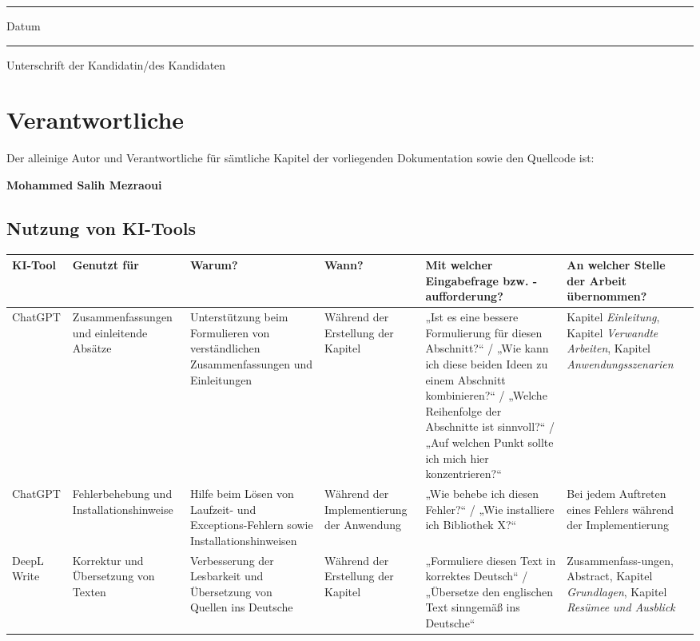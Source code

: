 \begin{small}
\vspace{4cm}
\begin{minipage}[t]{3cm}
	\rule{3cm}{0.5pt}
	Datum
\end{minipage}
\hfill
\begin{minipage}[t]{9cm}
	\rule{9cm}{0.5pt}
	Unterschrift der Kandidatin/des Kandidaten
\end{minipage}

\end{small}

\newpage

\section*{Verantwortliche}

Der alleinige Autor und Verantwortliche für sämtliche Kapitel der vorliegenden Dokumentation sowie den Quellcode ist:

\noindent \textbf{Mohammed Salih Mezraoui}


\newpage

\subsection*{Nutzung von KI-Tools}

\begin{table}
	\begin{small}	
		\begin{tabularx}{\textwidth}{|p{2.5cm}|p{3cm}|X|X|X|X|}
			\hline		
			\textbf{KI-Tool} & \textbf{Genutzt für} & \textbf{Warum?} & \textbf{Wann?} & \textbf{Mit welcher Eingabefrage bzw. -aufforderung?} & \textbf{An welcher Stelle der Arbeit übernommen?}\\
			\hline
			ChatGPT & Zusammenfassungen und einleitende Absätze & Unterstützung beim Formulieren von verständlichen Zusammenfassungen und Einleitungen & Während der Erstellung der Kapitel & „Ist es eine bessere Formulierung für diesen Abschnitt?“ / „Wie kann ich diese beiden Ideen zu einem Abschnitt kombinieren?“ / „Welche Reihenfolge der Abschnitte ist sinnvoll?“ / „Auf welchen Punkt sollte ich mich hier konzentrieren?“& Kapitel \emph{Einleitung}, Kapitel \emph{Verwandte Arbeiten}, Kapitel \emph{Anwendungsszenarien}\\
			\hline
			ChatGPT  & Fehlerbehebung und Installationshinweise & Hilfe beim Lösen von Laufzeit- und Exceptions-Fehlern sowie Installationshinweisen  & Während der Implementierung der Anwendung & „Wie behebe ich diesen Fehler?“ / „Wie installiere ich Bibliothek X?“  & Bei jedem Auftreten eines Fehlers während der Implementierung\\
			\hline
			DeepL Write & Korrektur und Übersetzung von Texten & Verbesserung der Lesbarkeit und Übersetzung von Quellen ins Deutsche & Während der Erstellung der Kapitel & „Formuliere diesen Text in korrektes Deutsch“ / „Übersetze den englischen Text sinngemäß ins Deutsche“ & Zusammenfass-ungen, Abstract, Kapitel \emph{Grundlagen}, Kapitel \emph{Resümee und Ausblick}\\
			\hline
		\end{tabularx}
	\end{small}
\end{table}


